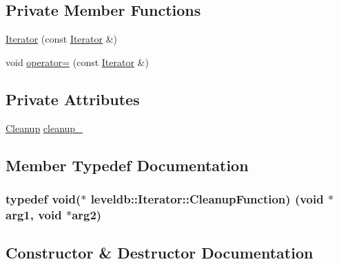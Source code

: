 \subsection*{Private Member Functions}
\begin{DoxyCompactItemize}
\item 
\hyperlink{classleveldb_1_1_iterator_a6bbdbbdd8d98fa68335d0c6be23192d3}{Iterator} (const \hyperlink{classleveldb_1_1_iterator}{Iterator} \&)
\item 
void \hyperlink{classleveldb_1_1_iterator_ae34607d7e20f4b74914d21e8ab2402ca}{operator=} (const \hyperlink{classleveldb_1_1_iterator}{Iterator} \&)
\end{DoxyCompactItemize}
\subsection*{Private Attributes}
\begin{DoxyCompactItemize}
\item 
\hyperlink{structleveldb_1_1_iterator_1_1_cleanup}{Cleanup} \hyperlink{classleveldb_1_1_iterator_aa65451661a270eab5db682d4e4a01773}{cleanup\+\_\+}
\end{DoxyCompactItemize}


\subsection{Member Typedef Documentation}
\hypertarget{classleveldb_1_1_iterator_ae40c9eedd82a722d24fde1fd8bee4afa}{}
\subsubsection[{Cleanup\+Function}]{\setlength{\rightskip}{0pt plus 5cm}typedef void($\ast$ leveldb\+::\+Iterator\+::\+Cleanup\+Function) (void $\ast$arg1, void $\ast$arg2)}\label{classleveldb_1_1_iterator_ae40c9eedd82a722d24fde1fd8bee4afa}


\subsection{Constructor \& Destructor Documentation}
\hypertarget{classleveldb_1_1_iterator_a1dc1cbc893e55a3fc990f08cf191480a}{}

